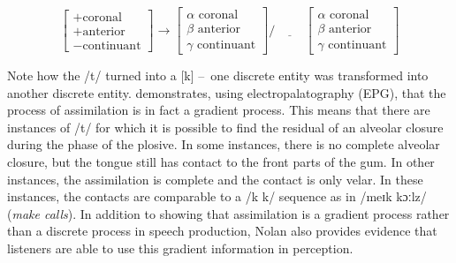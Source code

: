 \begin{equation}
\begin{bmatrix} 
+\text{coronal}\\
+\text{anterior}\\
-\text{continuant}
\end{bmatrix} 
\rightarrow
\begin{bmatrix} 
\alpha \,\, \text{coronal}\\
\beta \,\, \text{anterior}\\
\gamma \,\, \text{continuant}
\end{bmatrix}
/\underline{\hspace{1cm}}
\begin{bmatrix} 
\alpha \,\, \text{coronal}\\
\beta \,\, \text{anterior}\\
\gamma \,\, \text{continuant}
\end{bmatrix}
\label{eq:assimilation_rule}
\end{equation}

Note how the /t/ turned into a [k] – one discrete entity was transformed into another discrete entity. \cite{Nolan1992} demonstrates, using electropalatography (EPG), that the process of assimilation is in fact a gradient process. This means that there are instances of /t/ for which it is possible to find the residual of an alveolar closure during the phase of the plosive. In some instances, there is no complete alveolar closure, but the tongue still has contact to the front parts of the gum. In other instances, the assimilation is complete and the contact is only velar. In these instances, the contacts are comparable to a /k k/ sequence as in /meɪk kɔːlz/ (\emph{make calls}). In addition to showing that assimilation is a gradient process rather than a discrete process in speech production, Nolan also provides evidence that listeners are able to use this gradient information in perception.

